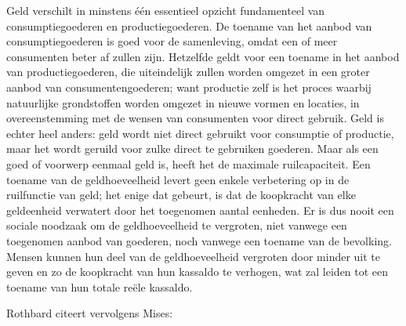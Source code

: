 \begin{blockquotebox}
    Geld verschilt in minstens één essentieel opzicht fundamenteel van consumptiegoederen en productiegoederen. De toename van het aanbod van consumptiegoederen is goed voor de samenleving, omdat een of meer consumenten beter af zullen zijn. Hetzelfde geldt voor een toename in het aanbod van productiegoederen, die uiteindelijk zullen worden omgezet in een groter aanbod van consumentengoederen; want productie zelf is het proces waarbij natuurlijke grondstoffen worden omgezet in nieuwe vormen en locaties, in overeenstemming met de wensen van consumenten voor direct gebruik. Geld is echter heel anders: geld wordt niet direct gebruikt voor consumptie of productie, maar het wordt geruild voor zulke direct te gebruiken goederen. Maar als een goed of voorwerp eenmaal geld is, heeft het de maximale ruilcapaciteit. Een toename van de geldhoeveelheid levert geen enkele verbetering op in de ruilfunctie van geld; het enige dat gebeurt, is dat de koopkracht van elke geldeenheid verwatert door het toegenomen aantal eenheden. Er is dus nooit een sociale noodzaak om de geldhoeveelheid te vergroten, niet vanwege een toegenomen aanbod van goederen, noch vanwege een toename van de bevolking. Mensen kunnen hun deel van de geldhoeveelheid vergroten door minder uit te geven en zo de koopkracht van hun kassaldo te verhogen, wat zal leiden tot een toename van hun totale reële kassaldo.\footnotemark
\end{blockquotebox}

Rothbard citeert vervolgens Mises:

